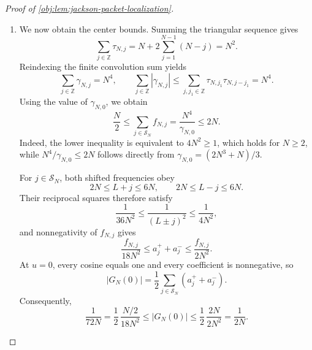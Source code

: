 \documentclass[11pt]{article}
\begin{document}
\begin{proof}[Proof of \cref{obj:lem:jackson-packet-localization}]
\begin{enumerate}
For completeness, cosine orthogonality reads, for \(j_1,j\in\mathbb Z\),
\[
\int_{-\pi}^{\pi}\cos(j_1u)\cos(ju)\,\frac{du}{2\pi}
=
\begin{cases}
1,&j_1=j=0,\\
\frac12,&|j_1|=|j|\neq0,\\
0,&\text{otherwise}.
\end{cases}
\]
This follows by the cosine product identity and integration of the integer modes. The sine part of the Fourier integral vanishes because \(\mathcal J_N\) is even. Hence
\[
\widehat{\mathcal J_N}(j)
=
\begin{cases}
f_{N,0},&j=0,\\
\dfrac{f_{N,j}+f_{N,-j}}2,&j\neq0,
\end{cases}
=f_{N,j}.
\]
In particular, the zero-extended sequences in the statement satisfy
\[
a_j^\pm=
\begin{cases}
f_{N,j}(L\pm j)^{-2},&j\in\mathcal S_N,\\
0,&j\notin\mathcal S_N.
\end{cases}
\]

\item We now obtain the center bounds. Summing the triangular sequence gives
\[
\sum_{j\in\mathbb Z}\tau_{N,j}
=N+2\sum_{j=1}^{N-1}(N-j)=N^2.
\]
Reindexing the finite convolution sum yields
\[
\sum_{j\in\mathbb Z}\gamma_{N,j}=N^4,
\qquad
\sum_{j\in\mathbb Z}|\gamma_{N,j}|
\leq
\sum_{j,j_1\in\mathbb Z}
\tau_{N,j_1}\tau_{N,j-j_1}
=N^4.
\]
Using the value of \(\gamma_{N,0}\), we obtain
\[
\frac N2
\leq
\sum_{j\in\mathcal S_N}f_{N,j}
=\frac{N^4}{\gamma_{N,0}}
\leq2N.
\]
Indeed, the lower inequality is equivalent to \(4N^2\geq1\), which holds for \(N\geq2\), while
\(N^4/\gamma_{N,0}\leq2N\) follows directly from
\(\gamma_{N,0}=(2N^3+N)/3\).

For \(j\in\mathcal S_N\), both shifted frequencies obey
\[
2N\leq L+j\leq6N,\qquad
2N\leq L-j\leq6N.
\]
Their reciprocal squares therefore satisfy
\[
\frac1{36N^2}\leq\frac1{(L\pm j)^2}\leq\frac1{4N^2},
\]
and nonnegativity of \(f_{N,j}\) gives
\[
\frac{f_{N,j}}{18N^2}
\leq a_j^++a_j^-
\leq\frac{f_{N,j}}{2N^2}.
\]
At \(u=0\), every cosine equals one and every coefficient is nonnegative, so
\[
|G_N(0)|=\frac12\sum_{j\in\mathcal S_N}(a_j^++a_j^-).
\]
Consequently,
\[
\frac1{72N}
=
\frac12\,\frac{N/2}{18N^2}
\leq |G_N(0)|
\leq
\frac12\,\frac{2N}{2N^2}
=\frac1{2N}.
\]


\end{enumerate}
\end{proof}
\end{document}
